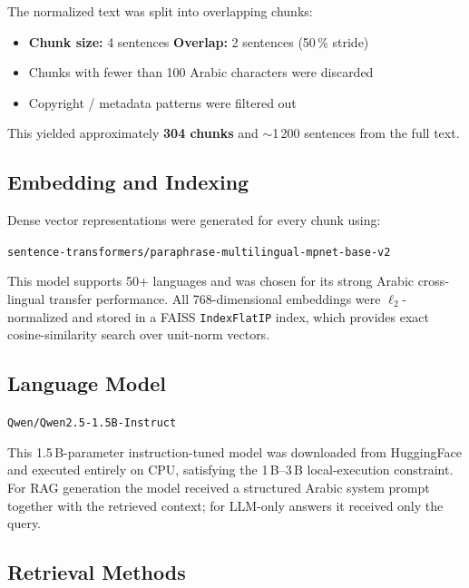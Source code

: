 The normalized text was split into overlapping chunks:

\begin{itemize}
  \item \textbf{Chunk size:} 4 sentences \quad
        \textbf{Overlap:} 2 sentences (50\,\% stride)
  \item Chunks with fewer than 100 Arabic characters were discarded
  \item Copyright / metadata patterns were filtered out
\end{itemize}

This yielded approximately \textbf{304 chunks} and
$\sim$1\,200 sentences from the full text.

\subsection{Embedding and Indexing}

Dense vector representations were generated for every chunk using:
\begin{center}
  \texttt{sentence-transformers/paraphrase-multilingual-mpnet-base-v2}
\end{center}
This model supports 50+ languages and was chosen for its strong Arabic
cross-lingual transfer performance.  All 768-dimensional embeddings were
$\ell_2$-normalized and stored in a FAISS
\texttt{IndexFlatIP} index, which provides exact cosine-similarity search
over unit-norm vectors.

\subsection{Language Model}

\begin{center}
  \texttt{Qwen/Qwen2.5-1.5B-Instruct}
\end{center}
This 1.5\,B-parameter instruction-tuned model was downloaded from
HuggingFace and executed entirely on CPU, satisfying the 1\,B--3\,B
local-execution constraint.  For RAG generation the model received
a structured Arabic system prompt together with the retrieved context;
for LLM-only answers it received only the query.

\subsection{Retrieval Methods}

